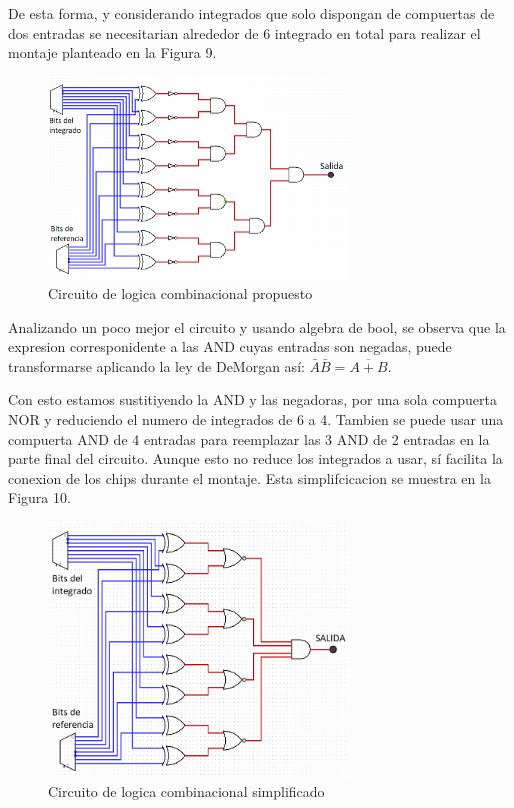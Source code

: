 \documentclass{article}
\begin{document}
De esta forma, y considerando integrados que solo dispongan de compuertas de dos entradas se necesitarian alrededor de 6 integrado en total para realizar el montaje planteado en la Figura 9.

\begin{figure}[!h] 
\includegraphics[width=8cm]{logica1.png}
\centering
\caption{Circuito de logica combinacional propuesto}
\end{figure}

Analizando un poco mejor el circuito y usando algebra de bool, se observa que la expresion corresponidente a las AND cuyas entradas son negadas, puede transformarse aplicando la ley de DeMorgan así: $\bar{A}\bar{B} = \overline{A+B}$.

Con esto estamos sustitiyendo la AND y las negadoras, por una sola compuerta NOR y reduciendo el numero de integrados de 6 a 4. Tambien se puede usar una compuerta AND de 4 entradas para reemplazar las 3 AND de 2 entradas en la parte final del circuito. Aunque esto no reduce los integrados a usar, sí facilita la conexion de los chips durante el montaje. Esta simplifcicacion se muestra en la Figura 10.

\begin{figure}[!hb] 
\includegraphics[width=8cm]{logica2.png}
\centering
\caption{Circuito de logica combinacional simplificado}
\end{figure}
\end{document}
